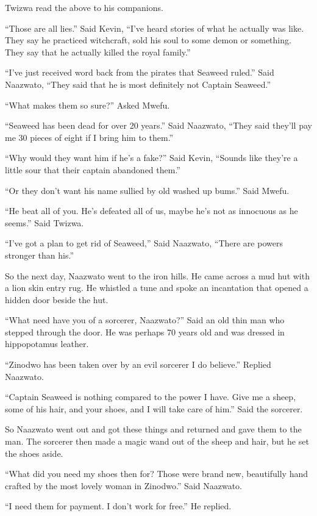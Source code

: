 Twizwa read the above to his companions.

``Those are all lies.'' Said Kevin, ``I've heard stories of what he actually was like. They say he practiced witchcraft, sold his soul to some demon or something. They say that he actually killed the royal family.''

``I've just received word back from the pirates that Seaweed ruled.'' Said Naazwato, ``They said that he is most definitely not Captain Seaweed.''

``What makes them so sure?'' Asked Mwefu.

``Seaweed has been dead for over 20 years.'' Said Naazwato, ``They said they'll pay me 30 pieces of eight if I bring him to them.''

``Why would they want him if he's a fake?'' Said Kevin, ``Sounds like they're a little sour that their captain abandoned them.''

``Or they don't want his name sullied by old washed up bums.'' Said Mwefu.

``He beat all of you. He's defeated all of us, maybe he's not as innocuous as he seems.'' Said Twizwa.

``I've got a plan to get rid of Seaweed,'' Said Naazwato, ``There are powers stronger than his.''

\tbreak

So the next day, Naazwato went to the iron hills. He came across a mud hut with a lion skin entry rug. He whistled a tune and spoke an incantation that opened a hidden door beside the hut.

``What need have you of a sorcerer, Naazwato?'' Said an old thin man who stepped through the door. He was perhaps 70 years old and was dressed in hippopotamus leather.

``Zinodwo has been taken over by an evil sorcerer I do believe.'' Replied Naazwato.

``Captain Seaweed is nothing compared to the power I have. Give me a sheep, some of his hair, and your shoes, and I will take care of him.'' Said the sorcerer.

So Naazwato went out and got these things and returned and gave them to the man. The sorcerer then made a magic wand out of the sheep and hair, but he set the shoes aside.

``What did you need my shoes then for?
Those were brand new, beautifully hand crafted by the most lovely woman in Zinodwo.'' Said Naazwato.

``I need them for payment. I don't work for free.'' He replied.

